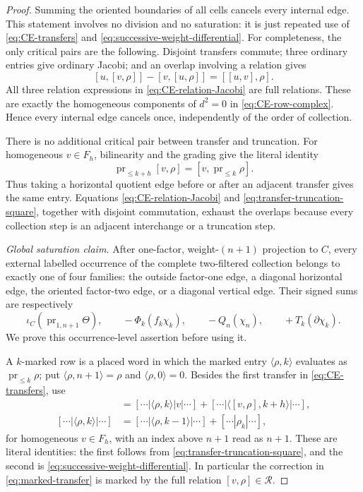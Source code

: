 \documentclass[11pt]{amsart}
\theoremstyle{remark}
\newcommand{\Rel}{\mathcal R}
\newcommand{\pr}{\operatorname{pr}}
\begin{document}
\begin{proof}
Summing the oriented boundaries of all cells cancels every internal
edge.  This statement involves no division and no saturation: it is
just repeated use of \eqref{eq:CE-transfers} and
\eqref{eq:successive-weight-differential}.  For completeness, the only
critical pairs are the following.  Disjoint transfers commute; three
ordinary entries give ordinary Jacobi; and an overlap involving a
relation gives
\begin{equation}\label{eq:CE-relation-Jacobi}
 [u,[v,\rho]]-[v,[u,\rho]]=[[u,v],\rho].
\end{equation}
All three relation expressions in \eqref{eq:CE-relation-Jacobi} are full
relations.  These are exactly the homogeneous components of $d^2=0$ in
\eqref{eq:CE-row-complex}.  Hence every internal edge cancels once,
independently of the order of collection.

	There is no additional critical pair between transfer and truncation.
	For homogeneous $v\in F_h$, bilinearity and the grading give the literal
	identity
\begin{equation}\label{eq:transfer-truncation-square}
 \pr_{\leq k+h}[v,\rho]=[v,\pr_{\leq k}\rho].
\end{equation}
Thus taking a horizontal quotient edge before or after an adjacent
transfer gives the same entry.  Equations
\eqref{eq:CE-relation-Jacobi} and
	\eqref{eq:transfer-truncation-square}, together with disjoint
	commutation, exhaust the overlaps because every collection step is an
	adjacent interchange or a truncation step.


\medskip
\noindent\emph{Global saturation claim.}
After one-factor, weight-$(n+1)$ projection to $C$, every external
labelled occurrence of the complete two-filtered collection belongs to
exactly one of four families: the outside factor-one edge, a diagonal
horizontal edge, the oriented factor-two edge, or a diagonal vertical
edge.  Their signed sums are respectively
\[
 \iota_C(\pr_{1,n+1}\Theta),\qquad
 -\Phi_k(f_k\chi_k),\qquad -Q_n(\chi_n),\qquad
 +T_k(\partial\chi_k).
\]
We prove this occurrence-level assertion before using it.

A $k$-marked
row is a placed word in which the marked entry
$\langle\rho,k\rangle$ evaluates as $\pr_{\leq k}\rho$; put
$\langle\rho,n+1\rangle=\rho$ and
$\langle\rho,0\rangle=0$.  Besides the first transfer in
\eqref{eq:CE-transfers}, use
\begin{align}
 [\cdots|v|\langle\rho,k\rangle|\cdots]
 &= [\cdots|\langle\rho,k\rangle|v|\cdots]
   +[\cdots|\langle[v,\rho],k+h\rangle|\cdots],
                                                        \label{eq:marked-transfer}\\
 [\cdots|\langle\rho,k\rangle|\cdots]
 &= [\cdots|\langle\rho,k-1\rangle|\cdots]
   +[\cdots|\rho_k|\cdots],
                                                        \label{eq:marked-truncation}
\end{align}
for homogeneous $v\in F_h$, with an index above $n+1$ read as
$n+1$.  These are literal identities: the first follows from
\eqref{eq:transfer-truncation-square}, and the second is
\eqref{eq:successive-weight-differential}.  In particular the
correction in \eqref{eq:marked-transfer} is marked by the full relation
$[v,\rho]\in\Rel$.


\end{proof}
\end{document}
